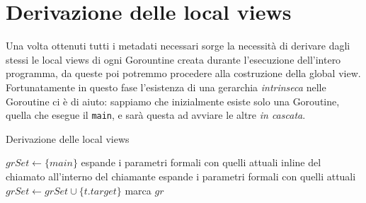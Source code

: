 \iffalse
    \subsection{Gestione degli stati finali}
\fi

\section{Derivazione delle local views}
Una volta ottenuti tutti i metadati necessari sorge la necessità di derivare dagli stessi le local views di ogni Gorountine creata durante l'esecuzione dell'intero programma, da queste poi potremmo procedere alla costruzione della global view.\bigskip\\
Fortunatamente in questo fase l'esistenza di una gerarchia \emph{intrinseca} nelle Goroutine ci è di aiuto: sappiamo che inizialmente esiste solo una Goroutine, quella che esegue il \texttt{main}, e sarà questa ad avviare le altre \emph{in cascata}.


\begin{algorithm}
    \caption{Derivazione delle local views}
    \begin{algorithmic}
        \State $grSet \gets \{ main \}$
         
         
        \State espande i parametri formali con quelli attuali
        \State inline del chiamato all'interno del chiamante
        \State espande i parametri formali con quelli attuali
        \State $grSet \gets grSet \cup \{ t.target \}$
        \EndIf
        \EndFor
        \State marca $gr$
        \EndWhile
    \end{algorithmic}
\end{algorithm}


